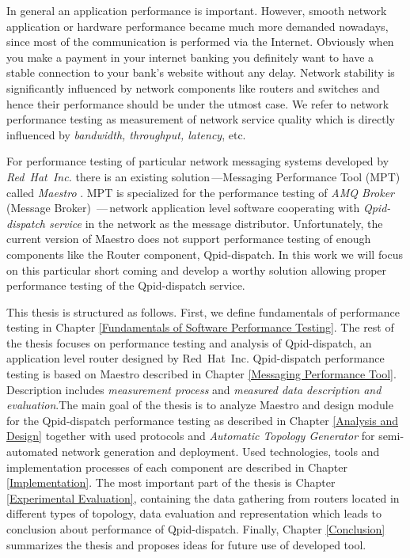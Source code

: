 In general an application performance is important. However, smooth network application or hardware performance became much more demanded nowadays, since most of the communication is performed via the Internet.  Obviously when you make a payment in your internet banking you definitely want to have a stable connection to your bank's website without any delay. Network stability is significantly influenced by network components like routers and switches and hence their performance should be under the utmost case. We refer to network performance testing as measurement of network service quality which is directly influenced by \emph{bandwidth, throughput, latency}, etc.

For performance testing of particular network messaging systems developed by \emph{Red~Hat~Inc.} there is an existing solution\,---Messaging Performance Tool (MPT) called \emph{Maestro} \cite{ORPISKE:MSGPT}. MPT is specialized for the performance testing of \emph{AMQ Broker} (Message Broker) \cite{RH:Broker}\,---\,network application level software cooperating with \emph{Qpid-dispatch service} \cite{RH:Interconnect} in the network as the message distributor. Unfortunately, the current version of Maestro does not support performance testing of enough components like the Router component, Qpid-dispatch. In this work we will focus on this particular short coming and develop a worthy solution allowing proper performance testing of the Qpid-dispatch service.

This thesis is structured as follows. First, we define fundamentals of performance testing in Chapter \ref{Fundamentals of Software Performance Testing}. The rest of the thesis focuses on performance testing and analysis of Qpid-dispatch, an application level router designed by Red~Hat~Inc. Qpid-dispatch performance testing is based on Maestro described in Chapter \ref{Messaging Performance Tool}. Description includes \emph{measurement process} and \emph{measured data description and evaluation}.The main goal of the thesis is to analyze Maestro and design module for the Qpid-dispatch performance testing as described in Chapter \ref{Analysis and Design} together with used protocols and \emph{Automatic Topology Generator} for semi-automated network generation and deployment. Used technologies, tools and  implementation processes of each component are described in Chapter \ref{Implementation}. The most important part of the thesis is Chapter \ref{Experimental Evaluation}, containing the data gathering  from routers located in different types of topology, data evaluation and representation which leads to conclusion about performance of Qpid-dispatch. Finally, Chapter \ref{Conclusion} summarizes the thesis and proposes ideas for future use of developed tool.

